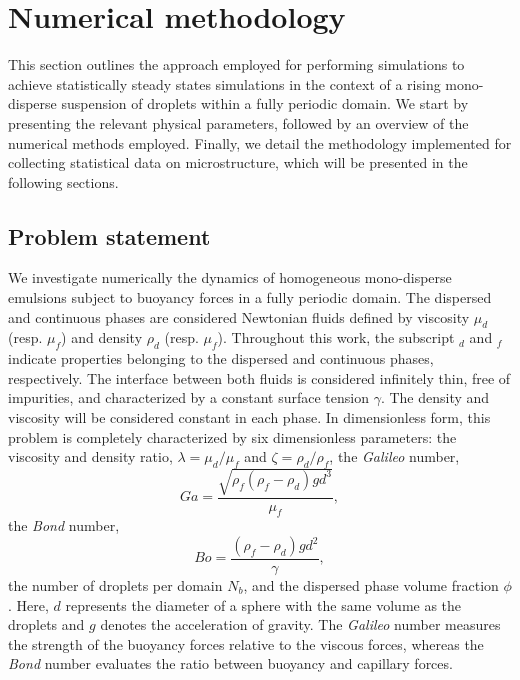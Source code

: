 \documentclass[11pt]{My_preprint}
\begin{document}
\section{Numerical methodology}
\label{sec:methodo}

This section outlines the approach employed for performing simulations to achieve statistically steady states simulations in the context of a rising mono-disperse suspension of droplets within a fully periodic domain.
We start by presenting the relevant physical parameters, followed by an overview of the numerical methods employed.
Finally, we detail the methodology implemented for collecting statistical data on microstructure, which will be presented in the following sections.



\subsection{Problem statement}

We investigate numerically the dynamics of homogeneous mono-disperse emulsions subject to buoyancy forces in a fully periodic domain. 
The dispersed and continuous phases are considered Newtonian fluids defined by viscosity $\mu_d$ (resp. $\mu_f$) and density $\rho_d$ (resp. $\mu_f$).
Throughout this work, the subscript $_d$ and $_f$ indicate properties belonging to the dispersed and continuous phases, respectively. 
The interface between both fluids is considered infinitely thin, free of impurities, and characterized by a constant surface tension $\gamma$. The density and viscosity will be considered constant in each phase.
In dimensionless form, this problem is completely characterized by six dimensionless parameters:  the viscosity and density ratio, $\lambda = \mu_d / \mu_f$ and $\zeta = \rho_d / \rho_f$,  
the \textit{Galileo} number, 
\begin{equation*}
    Ga =\frac{\sqrt{\rho_f(\rho_f - \rho_d) g d^3}}{\mu_f},
\end{equation*}
the \textit{Bond} number, 
\begin{equation*}
    Bo =\frac{(\rho_f - \rho_d) g d^2}{\gamma},
\end{equation*}
the number of droplets per domain $N_b$, and the dispersed phase volume fraction $\phi$. 
Here, $d$ represents the diameter of a sphere with the same volume as the droplets and $g$ denotes the acceleration of gravity.
The \textit{Galileo} number measures the strength of the buoyancy forces relative to the viscous forces, whereas the \textit{Bond} number evaluates the ratio between buoyancy and capillary forces. 
\end{document}
